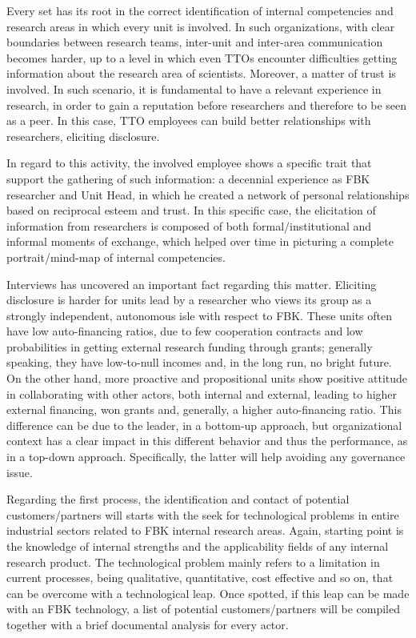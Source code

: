 Every set has its root in the correct identification of internal competencies and research areas in which every unit is involved. In such organizations, with clear boundaries between research teams, inter-unit and inter-area communication becomes harder, up to a level in which even TTOs encounter difficulties getting information about the research area of scientists. Moreover, a matter of trust is involved. In such scenario, it is fundamental to have a relevant experience in research, in order to gain a reputation before researchers and therefore to be seen as a peer. In this case, TTO employees can build better relationships with researchers, eliciting disclosure.

In regard to this activity, the involved employee shows a specific trait that support the gathering of such information: a decennial experience as FBK researcher and Unit Head, in which he created a network of personal relationships based on reciprocal esteem and trust. In this specific case, the elicitation of information from researchers is composed of both formal/institutional and informal moments of exchange, which helped over time in picturing a complete portrait/mind-map of internal competencies.

Interviews has uncovered an important fact regarding this matter. Eliciting disclosure is harder for units lead by a researcher who views its group as a strongly independent, autonomous isle with respect to FBK. These units often have low auto-financing ratios, due to few cooperation contracts and low probabilities in getting external research funding through grants; generally speaking, they have low-to-null incomes and, in the long run, no bright future. On the other hand, more proactive and propositional units show positive attitude in collaborating with other actors, both internal and external, leading to higher external financing, won grants and, generally, a higher auto-financing ratio. This difference can be due to the leader, in a bottom-up approach, but organizational context has a clear impact in this different behavior and thus the performance, as in a top-down approach. Specifically, the latter will help avoiding any governance issue.

Regarding the first process, the identification and contact of potential customers/partners will starts with the seek for technological problems in entire industrial sectors related to FBK internal research areas. Again, starting point is the knowledge of internal strengths and the applicability fields of any internal research product. The technological problem mainly refers to a limitation in current processes, being qualitative, quantitative, cost effective and so on, that can be overcome with a technological leap. Once spotted, if this leap can be made with an FBK technology, a list of potential customers/partners will be compiled together with a brief documental analysis for every actor. 

